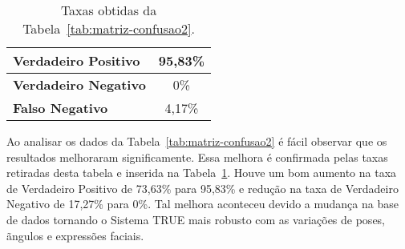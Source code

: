 	\begin{table}[htb]
		\begin{center}
			\caption{Taxas obtidas da Tabela~\ref{tab:matriz-confusao2}.}
			\label{tab:taxas2}
			\begin{tabular}{|l|c|}
				\hline \bf Verdadeiro Positivo & 95,83\% \\
				\hline \bf Verdadeiro Negativo & 0\% \\
				\hline \bf Falso Negativo & 4,17\% \\
				\hline
			\end{tabular}
		\end{center}
	\end{table}

	Ao analisar os dados da Tabela~\ref{tab:matriz-confusao2} é fácil observar que os resultados melhoraram significamente. Essa melhora é confirmada pelas taxas retiradas desta tabela e inserida na Tabela~\ref{tab:taxas2}. Houve um bom aumento na taxa de Verdadeiro Positivo de 73,63\% para 95,83\% e redução na taxa de Verdadeiro Negativo de 17,27\% para 0\%. Tal melhora aconteceu devido a mudança na base de dados tornando o Sistema TRUE mais robusto com as variações de poses, ãngulos e expressões faciais.


